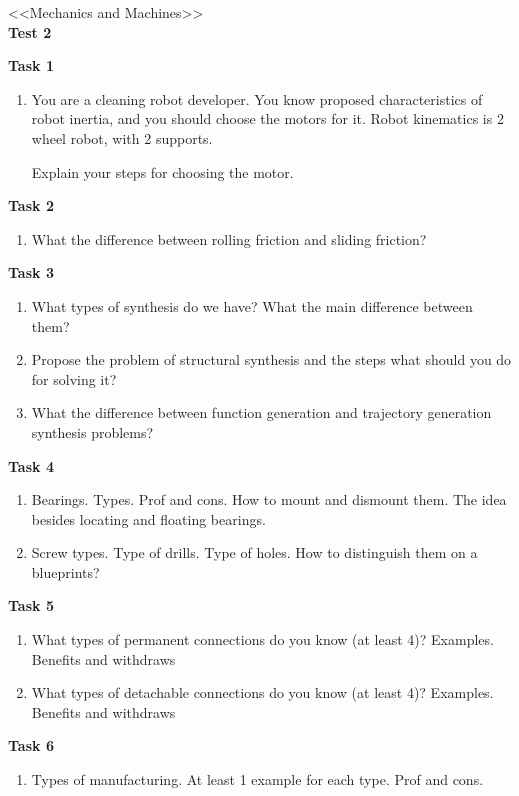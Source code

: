 \documentclass[12pt]{article}
\begin{document}
\begin{center}
    \LARGE <<Mechanics and Machines>> \\ \textbf{Test 2}
\end{center}

\textbf{Task 1}
\begin{enumerate}
    \item You are a cleaning robot developer. You know proposed characteristics of robot inertia, and you should choose the motors for it. Robot kinematics is 2 wheel robot, with 2 supports.

    Explain your steps for choosing the motor.
\end{enumerate}

\textbf{Task 2}
\begin{enumerate}
    \item What the difference between rolling friction and sliding friction? 
\end{enumerate}

\textbf{Task 3}
\begin{enumerate}
    \item What types of synthesis do we have? What the main difference between them?
    \item Propose the problem of structural synthesis and the steps what should you do for solving it?
    \item What the difference between function generation and trajectory generation synthesis problems?
\end{enumerate}

\textbf{Task 4}
\begin{enumerate}
    \item Bearings. Types. Prof and cons. How to mount and dismount them. The idea besides locating and floating bearings.
    \item Screw types. Type of drills. Type of holes. How to distinguish them on a blueprints?
\end{enumerate}

\textbf{Task 5}
\begin{enumerate}
    \item What types of permanent connections do you know (at least 4)? Examples. Benefits and withdraws
    \item What types of detachable connections do you know (at least 4)? Examples. Benefits and withdraws
\end{enumerate}

\textbf{Task 6}
\begin{enumerate}
    \item Types of manufacturing. At least 1 example for each type. Prof and cons.
\end{enumerate}
\end{document}
